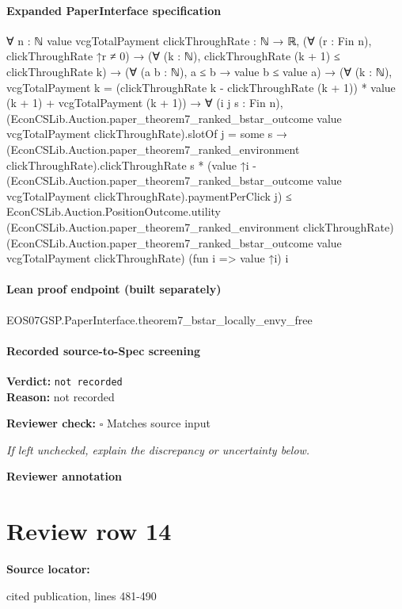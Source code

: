 \documentclass[10pt]{article}
\newcommand{\reviewerbox}{%
  \par\noindent\fbox{\parbox{0.96\linewidth}{\rule{0pt}{0.38in}}}\par
}
\newcommand{\reviewmatch}[1]{%
  \par\noindent\textbf{Reviewer check:} $\square$\; #1\par
  \noindent\emph{If left unchecked, explain the discrepancy or uncertainty below.}\par
}
\begin{document}
\paragraph{Expanded PaperInterface specification}
\begin{ReviewVerbatim}
∀ {n : ℕ} {value vcgTotalPayment clickThroughRate : ℕ → ℝ},
  (∀ (r : Fin n), clickThroughRate ↑r ≠ 0) →
    (∀ (k : ℕ), clickThroughRate (k + 1) ≤ clickThroughRate k) →
      (∀ (a b : ℕ), a ≤ b → value b ≤ value a) →
        (∀ (k : ℕ),
            vcgTotalPayment k =
              (clickThroughRate k - clickThroughRate (k + 1)) * value (k + 1) + vcgTotalPayment (k + 1)) →
          ∀ (i j s : Fin n),
            (EconCSLib.Auction.paper_theorem7_ranked_bstar_outcome value vcgTotalPayment clickThroughRate).slotOf j =
                some s →
              (EconCSLib.Auction.paper_theorem7_ranked_environment clickThroughRate).clickThroughRate s *
                  (value ↑i -
                    (EconCSLib.Auction.paper_theorem7_ranked_bstar_outcome value vcgTotalPayment
                          clickThroughRate).paymentPerClick
                      j) ≤
                EconCSLib.Auction.PositionOutcome.utility
                  (EconCSLib.Auction.paper_theorem7_ranked_environment clickThroughRate)
                  (EconCSLib.Auction.paper_theorem7_ranked_bstar_outcome value vcgTotalPayment clickThroughRate)
                  (fun i => value ↑i) i
\end{ReviewVerbatim}

\paragraph{Lean proof endpoint (built separately)}\begin{ReviewVerbatim}
EOS07GSP.PaperInterface.theorem7_bstar_locally_envy_free
\end{ReviewVerbatim}

\paragraph{Recorded source-to-Spec screening}
\textbf{Verdict:} \texttt{not recorded}
\\
\textbf{Reason:} not recorded
\reviewmatch{Matches source input}
\noindent\textbf{Reviewer annotation}\par
\reviewerbox
\clearpage
\hypertarget{source-claim-2b16a7ac7ff0bb26}{}
\section*{Review row 14}
\textbf{Source locator:} {\footnotesize\raggedright cited publication, lines 481-\allowbreak{}490\par}
\end{document}
